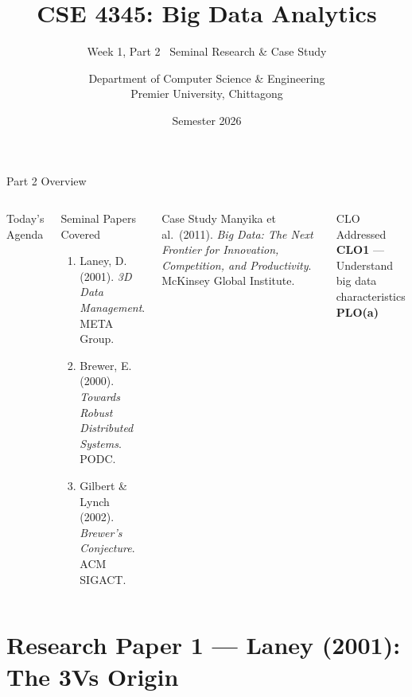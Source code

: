 \documentclass[aspectratio=169,10pt]{beamer}
\title[CSE 4345 \textbar{} Week 1, Part 2]{CSE 4345: Big Data Analytics}
\subtitle{Week 1, Part 2 \textemdash\ Seminal Research \& Case Study}
\author[Dept.\ of CSE]{Department of Computer Science \& Engineering\\[4pt]
       \small Premier University, Chittagong}
\institute{}
\date{Semester 2026}
\begin{document}

\begin{frame}
  \titlepage
\end{frame}

\begin{frame}{Part 2 Overview}
  \begin{columns}[T]
      \begin{block}{Today's Agenda}
        \tableofcontents
      \end{block}

      \begin{exampleblock}{Seminal Papers Covered}
        \begin{enumerate}
          \item Laney, D. (2001). \textit{3D Data Management}. META Group.
          \item Brewer, E. (2000). \textit{Towards Robust Distributed Systems}. PODC.
          \item Gilbert \& Lynch (2002). \textit{Brewer's Conjecture}. ACM SIGACT.
        \end{enumerate}
      \end{exampleblock}
      \vspace{6pt}
      \begin{alertblock}{Case Study}
        Manyika et al.\ (2011). \textit{Big Data: The Next Frontier for Innovation, Competition, and Productivity}. McKinsey Global Institute.
      \end{alertblock}
      \vspace{4pt}
      \begin{block}{CLO Addressed}
        \textbf{CLO1} — Understand big data characteristics\\
        \textbf{PLO(a)}
      \end{block}
  \end{columns}
\end{frame}

\section{Research Paper 1 — Laney (2001): The 3Vs Origin}
\end{document}
